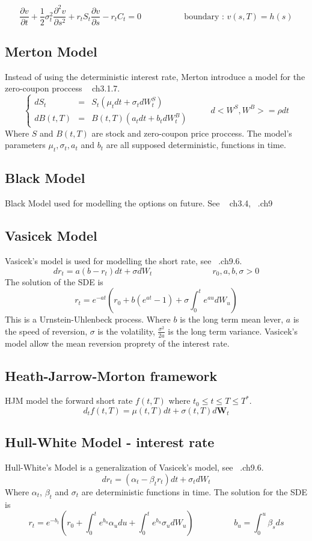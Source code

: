 \documentclass[a4paper,10pt]{article}
\begin{document}
\[
\frac{\partial v}{\partial t} +
\frac{1}{2}\sigma^2_t \frac{\partial^2 v}{\partial s^2} +
r_t S_t \frac{\partial v}{\partial s} - 
r_t C_t =0
\hspace{2cm}
\text{ boundary : } v(s,T) = h(s)
\]
\subsection{Merton Model}
Instead of using the deterministic interest rate, Merton introduce a model for the zero-coupon proccess ~\cite{MAREK} ch3.1.7.
\[
\left\{ 
\begin{array}{rcl}
dS_t    &=& S_t( \mu_t dt + \sigma_t d W^{S}_t )  \\ 
dB(t,T) &=& B(t,T) ( a_t dt + b_t d W^{B}_t )
\end{array}\right. 
\hspace{1cm}
d<W^S,W^B> = \rho dt
\]
Where $S$ and $B(t,T)$ are stock and zero-coupon price proccess. The model's parameters $\mu_t, \sigma_t, a_t$ and $b_t$ are all supposed deterministic, functions in time.

\subsection{Black Model}
Black Model used for modelling the options on future. See ~\cite{MAREK} ch3.4, ~\cite{ELLIOT}.ch9
\subsection{Vasicek Model}
Vasicek's model is used for modelling the short rate, see ~\cite{ELLIOT}.ch9.6.
\[
dr_t = a (b-r_t) dt +\sigma  dW_t
\hspace{3cm}
r_0, a,b,\sigma >0
\]
The solution of the SDE is 
\[
r_t = e^{-at}( r_0 + b(e^{at} -1) + \sigma\int_0^t e^{au}dW_u   )
\]
This is a Urnstein-Uhlenbeck process. Where $b$ is the long term mean lever, $a$ is the speed of reversion, $\sigma$ is the volatility, $\frac{\sigma^2}{2a}$ is the long term variance. Vasicek's model allow the mean reversion proprety of the interest rate.

\subsection{Heath-Jarrow-Morton framework}
HJM model the forward short rate $f(t,T)$ where $t_0\leq t \leq T \leq T^*$.
\[
d_t f(t,T) = \mu(t,T)dt + \sigma(t,T)d\textbf{W}_t
\]

\subsection{Hull-White Model - interest rate}
Hull-White's Model is a generalization of Vasicek's model, see ~\cite{ELLIOT}.ch9.6. 
\[
dr_t = (\alpha_t - \beta_t r_t) dt +\sigma_t dW_t
\]
Where $\alpha_t$, $\beta_t$ and $\sigma_t$ are deterministic functions in time. The solution for the SDE is
\[
r_t = e^{-b_t} ( r_0 + \int_0^t e^{b_u}\alpha_u du + \int_0^t e^{b_u} \sigma_u dW_u   )
\hspace{2cm}
b_u = \int_0^u \beta_s ds 
\]
\end{document}
